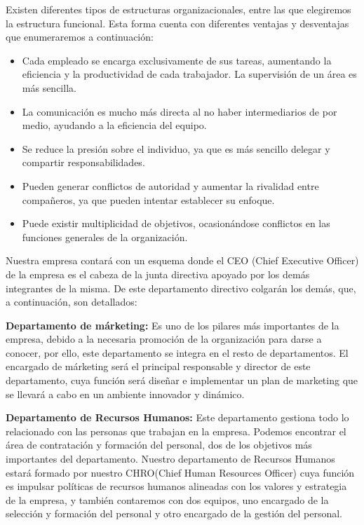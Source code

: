 Existen diferentes tipos de estructuras organizacionales, entre las que elegiremos la estructura funcional. Esta forma cuenta con diferentes ventajas y desventajas que enumeraremos a continuación:

\begin{itemize}
    \item Cada empleado se encarga exclusivamente de sus tareas, aumentando la eficiencia y la productividad de cada trabajador.
    La supervisión de un área es más sencilla.
    \item La comunicación es mucho más directa al no haber intermediarios de por medio, ayudando a la eficiencia del equipo.
    \item Se reduce la presión sobre el individuo, ya que es más sencillo delegar y compartir responsabilidades.
    \item Pueden generar conflictos de autoridad y aumentar la rivalidad entre compañeros, ya que pueden intentar establecer su enfoque.
    \item Puede existir multiplicidad de objetivos, ocasionándose conflictos en las funciones generales de la organización.    
\end{itemize}

Nuestra empresa contará con un esquema donde el CEO (Chief Executive Officer) de la empresa es el cabeza de la junta directiva apoyado por los demás integrantes de la misma. De este departamento directivo colgarán los demás, que, a continuación, son detallados:

\textbf{Departamento de márketing:} Es uno de los pilares más importantes de la empresa, debido a la necesaria promoción de la organización para darse a conocer, por ello, este departamento se integra en el resto de departamentos. El encargado de márketing será el principal responsable y director de este departamento, cuya función será diseñar e implementar un plan de marketing que se llevará a cabo en un ambiente innovador y dinámico.

\textbf{Departamento de Recursos Humanos:} Este departamento gestiona todo lo relacionado con las personas que trabajan en la empresa. Podemos encontrar el área de contratación y formación del personal, dos de los objetivos más importantes del departamento. Nuestro departamento de Recursos Humanos estará formado por nuestro CHRO(Chief Human Resources Officer) cuya función es impulsar políticas de recursos humanos alineadas con los valores y estrategia de la empresa, y también contaremos con dos equipos, uno encargado de la selección y formación del personal y otro encargado de la gestión del personal.

